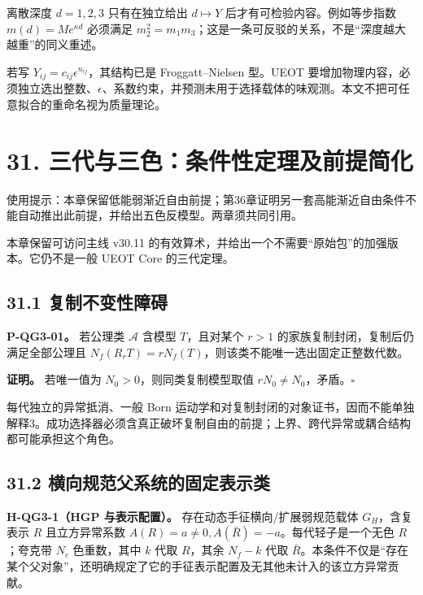 \documentclass[
  11pt,
  oneside]{book}
\begin{document}
离散深度 \(d=1,2,3\) 只有在独立给出 \(d\mapsto Y\)
后才有可检验内容。例如等步指数 \(m(d)=Me^{\kappa d}\) 必须满足
\(m_2^2=m_1m_3\)；这是一条可反驳的关系，不是``深度越大越重''的同义重述。

若写 \(Y_{ij}=c_{ij}\epsilon^{n_{ij}}\)，其结构已是 Froggatt--Nielsen
型。UEOT
要增加物理内容，必须独立选出整数、\(\epsilon\)、系数约束，并预测未用于选择载体的味观测。本文不把可任意拟合的重命名视为质量理论。

\hypertarget{ch-31}{%
\chapter{31. 三代与三色：条件性定理及前提简化}\label{ch-31}}

使用提示：本章保留低能弱渐近自由前提；第36章证明另一套高能渐近自由条件不能自动推出此前提，并给出五色反模型。两章须共同引用。

本章保留可访问主线 v30.11
的有效算术，并给出一个不需要``原始包''的加强版本。它仍不是一般 UEOT Core
的三代定理。

\hypertarget{ux590dux5236ux4e0dux53d8ux6027ux969cux788d}{%
\section{31.1
复制不变性障碍}\label{ux590dux5236ux4e0dux53d8ux6027ux969cux788d}}

\protect\hypertarget{p-qg3-01}{}{}

\textbf{P-QG3-01。} 若公理类 \(\mathcal A\) 含模型 \(T\)，且对某个
\(r>1\) 的家族复制封闭，复制后仍满足全部公理且
\(N_f(R_rT)=rN_f(T)\)，则该类不能唯一选出固定正整数代数。

\textbf{证明。} 若唯一值为 \(N_0>0\)，则同类复制模型取值
\(rN_0\ne N_0\)，矛盾。\(\square\)

每代独立的异常抵消、一般 Born
运动学和对复制封闭的对象证书，因而不能单独解释3。成功选择器必须含真正破坏复制自由的前提；上界、跨代异常或耦合结构都可能承担这个角色。

\hypertarget{ux6a2aux5411ux89c4ux8303ux7236ux7cfbux7edfux7684ux56faux5b9aux8868ux793aux7c7b}{%
\section{31.2
横向规范父系统的固定表示类}\label{ux6a2aux5411ux89c4ux8303ux7236ux7cfbux7edfux7684ux56faux5b9aux8868ux793aux7c7b}}

\textbf{H-QG3-1（HGP 与表示配置）。} 存在动态手征横向/扩展弱规范载体
\(G_H\)，含复表示 \(R\) 且立方异常系数
\(A(R)=a\ne0,A(\bar R)=-a\)。每代轻子是一个无色 \(R\)；夸克带 \(N_c\)
色重数，其中 \(k\) 代取 \(R\)，其余 \(N_f-k\) 代取
\(\bar R\)。本条件不仅是``存在某个父对象''，还明确规定了它的手征表示配置及无其他未计入的该立方异常贡献。
\end{document}
